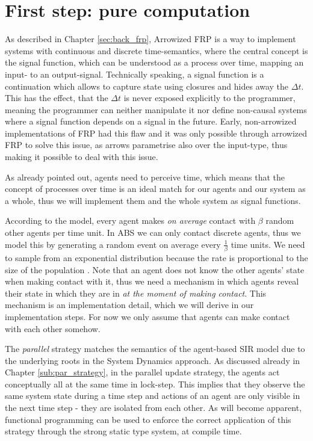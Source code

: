 \section{First step: pure computation}
\label{sec:timedriven_firststep}
As described in Chapter \ref{sec:back_frp}, Arrowized FRP \cite{hughes_generalising_2000} is a way to implement systems with continuous and discrete time-semantics, where the central concept is the signal function, which can be understood as a process over time, mapping an input- to an output-signal. Technically speaking, a signal function is a continuation which allows to capture state using closures and hides away the $\Delta t$. This has the effect, that the $\Delta t$ is never exposed explicitly to the programmer, meaning the programmer can neither manipulate it nor define non-causal systems where a signal function depends on a signal in the future. Early, non-arrowized implementations of FRP had this flaw and it was only possible through arrowized FRP to solve this issue, as arrows parametrise also over the input-type, thus making it possible to deal with this issue.

As already pointed out, agents need to perceive time, which means that the concept of processes over time is an ideal match for our agents and our system as a whole, thus we will implement them and the whole system as signal functions.

According to the model, every agent makes \textit{on average} contact with $\beta$ random other agents per time unit. In ABS we can only contact discrete agents, thus we model this by generating a random event on average every $\frac{1}{\beta}$ time units. We need to sample from an exponential distribution because the rate is proportional to the size of the population \cite{borshchev_system_2004}. Note that an agent does not know the other agents' state when making contact with it, thus we need a mechanism in which agents reveal their state in which they are in \textit{at the moment of making contact}. This mechanism is an implementation detail, which we will derive in our implementation steps. For now we only assume that agents can make contact with each other somehow.

The \textit{parallel} strategy matches the semantics of the agent-based SIR model due to the underlying roots in the System Dynamics approach. As discussed already in Chapter \ref{sub:par_strategy}, in the parallel update strategy, the agents act conceptually all at the same time in lock-step. This implies that they observe the same system state during a time step and actions of an agent are only visible in the next time step - they are isolated from each other. As will become apparent, functional programming can be used to enforce the correct application of this strategy through the strong static type system, at compile time.

